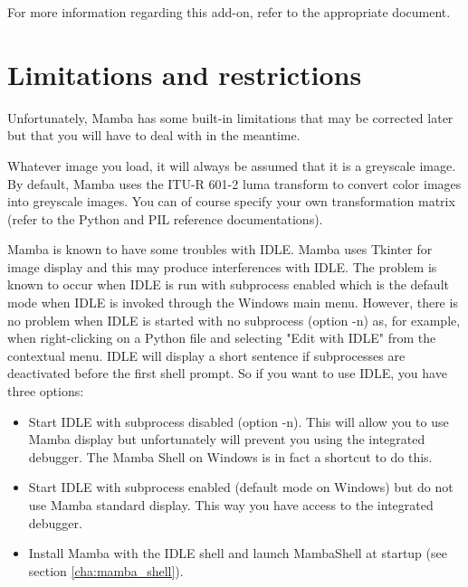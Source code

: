 \documentclass[a4paper,10pt,oneside]{article}
\begin{document}

For more information regarding this add-on, refer to the appropriate document.

\pagebreak

\section{Limitations and restrictions}
\label{cha:lim_restrict}

Unfortunately, Mamba has some built-in limitations that may be corrected later
but that you will have to deal with in the meantime.

Whatever image you load, it will always be assumed that it is a greyscale image.
By default, Mamba uses the ITU-R 601-2 luma transform to convert color images 
into greyscale images. You can of course specify your own transformation matrix 
(refer to the Python and PIL reference documentations).

Mamba is known to have some troubles with IDLE. Mamba uses
Tkinter for image display and this may produce interferences with IDLE. The
problem is known to occur when IDLE is run with subprocess enabled which is the
default mode when IDLE is invoked through the Windows main menu. However, there 
is no problem when IDLE is started with no subprocess (option -n) as, for 
example, when right-clicking on a Python file and selecting "Edit with IDLE" from
the contextual menu. IDLE will display a short sentence if subprocesses are
deactivated before the first shell prompt. So if you want to use IDLE, you have
three options:

\begin{itemize}
\item Start IDLE with subprocess disabled (option -n). This will allow you to 
use Mamba display but unfortunately will prevent you using the integrated
debugger. The Mamba Shell on Windows is in fact a shortcut to do this.
\item Start IDLE with subprocess enabled (default mode on Windows) but do not
use Mamba standard display. This way you have access to the integrated debugger.
\item Install Mamba with the IDLE shell and launch MambaShell at startup (see
section \ref{cha:mamba_shell}).
\end{itemize}
\end{document}
